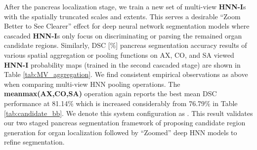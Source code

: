 \documentclass[journal]{IEEEtran}
\begin{document}
After the pancreas localization stage, we train a new set of multi-view \textbf{HNN-I}s with the spatially truncated scales and extents. This serves a desirable ``Zoom Better to See Clearer'' effect for deep neural network segmentation models \cite{Xia2016Zoom} where cascaded \textbf{HNN-I}s only focus on discriminating or parsing the remained organ candidate regions. Similarly, DSC [\%] pancreas segmentation accuracy results of various spatial aggregation or pooling functions on AX, CO, and SA viewed \textbf{HNN-I} probability maps (trained in the second cascaded stage) are shown in Table \ref{tab:MV_aggregation}. We find consistent empirical observations as above when comparing multi-view HNN pooling operations. The \textbf{meanmax(AX,CO,SA)} operation again reports the best mean DSC performance at 81.14\% which is increased considerably from 76.79\% in Table \ref{tab:candidate_bb}. We denote this system configuration as . This result validates our two staged pancreas segmentation framework of proposing candidate region generation for organ localization followed by ``Zoomed''  deep HNN models to refine segmentation.
\end{document}
